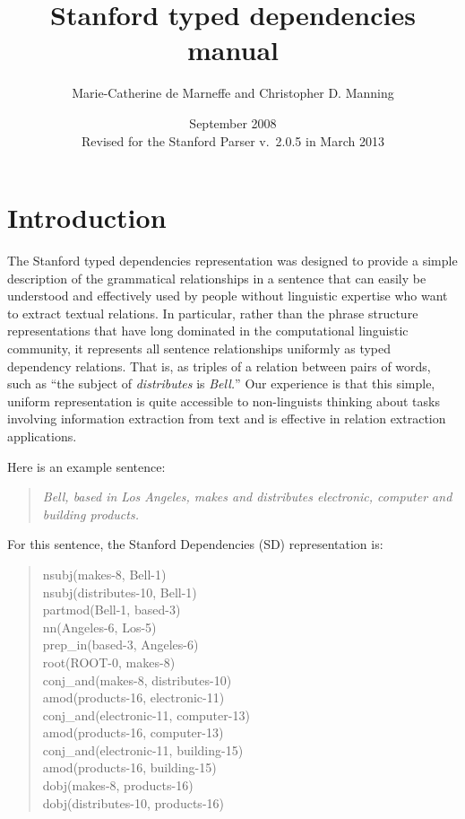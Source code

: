 \documentclass[11pt,letter]{article}
\title{\textbf{Stanford typed dependencies manual}}
\author{Marie-Catherine de Marneffe and Christopher D. Manning}
\date{September 2008\\
Revised for the Stanford Parser v.\ 2.0.5 in March 2013
}
\begin{document}
\maketitle

\section{Introduction}

The Stanford typed dependencies representation was designed to provide
a simple description of the grammatical relationships in a sentence
that can easily be understood and effectively used by people without
linguistic expertise who want to extract textual relations.  In
particular, rather than the phrase structure representations that have
long dominated in the computational linguistic community, it
represents all sentence relationships uniformly as typed dependency
relations. That is, as triples of a relation between pairs of words, such as ``the subject of
\emph{distributes} is \emph{Bell.}''  Our experience is that this simple,
uniform representation is quite accessible to non-linguists
thinking about tasks involving information extraction from text and is
effective in relation extraction applications.

Here is an example sentence:
\begin{quote}
\emph{Bell, based in Los Angeles, makes and distributes electronic, computer and building products.}
\end{quote}
For this sentence, the Stanford Dependencies (SD) representation is:
\begin{quote}
nsubj(makes-8, Bell-1) \\
nsubj(distributes-10, Bell-1) \\
partmod(Bell-1, based-3) \\
nn(Angeles-6, Los-5) \\
prep\_in(based-3, Angeles-6) \\
root(ROOT-0, makes-8)\\
conj\_and(makes-8, distributes-10) \\
amod(products-16, electronic-11) \\
conj\_and(electronic-11, computer-13) \\
amod(products-16, computer-13) \\
conj\_and(electronic-11, building-15) \\
amod(products-16, building-15) \\
dobj(makes-8, products-16) \\
dobj(distributes-10, products-16)
\end{quote}
\end{document}
